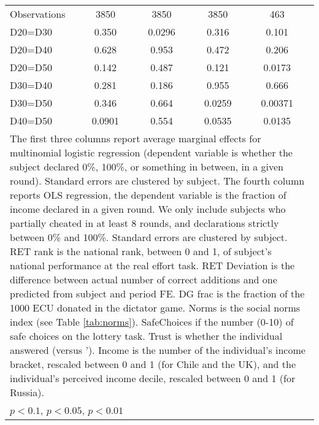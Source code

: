 \begin{tabular}{l|cccccc|cc}
\hline
Observations    &     3850         &         &     3850         &         &     3850         &         &      463         &         \\
D20=D30         &    0.350         &         &   0.0296         &         &    0.316         &         &    0.101         &         \\
D20=D40         &    0.628         &         &    0.953         &         &    0.472         &         &    0.206         &         \\
D20=D50         &    0.142         &         &    0.487         &         &    0.121         &         &   0.0173         &         \\
D30=D40         &    0.281         &         &    0.186         &         &    0.955         &         &    0.666         &         \\
D30=D50         &    0.346         &         &    0.664         &         &   0.0259         &         &  0.00371         &         \\
D40=D50         &   0.0901         &         &    0.554         &         &   0.0535         &         &   0.0135         &         \\
\hline\hline
\multicolumn{9}{p{16cm}}{\tiny The first three columns report average marginal effects for multinomial logistic regression (dependent variable is whether the subject declared 0\%, 100\%, or something in between, in a given round). Standard errors are clustered by subject. The fourth column reports OLS regression, the dependent variable is the fraction of income declared in a given round. We only include subjects who partially cheated in at least 8 rounds, and declarations strictly between 0\% and 100\%. Standard errors are clustered by subject. RET rank is the national rank, between 0 and 1, of subject's national performance at the real effort task. RET Deviation is the difference between actual number of correct additions and one predicted from subject and period FE. DG frac is the fraction of the 1000 ECU donated in the dictator game. Norms is the social norms index (see Table \ref{tab:norms}). SafeChoices if the number (0-10) of safe choices on the lottery task. Trust is whether the individual answered  (versus '). Income is the number of the individual's income bracket, rescaled between 0 and 1 (for Chile and the UK), and the individual's perceived income decile, rescaled between 0 and 1 (for Russia).}\\
\multicolumn{9}{l}{\tiny \sym{*} \(p<0.1\), \sym{**} \(p<0.05\), \sym{***} \(p<0.01\)}\\
\end{tabular}
